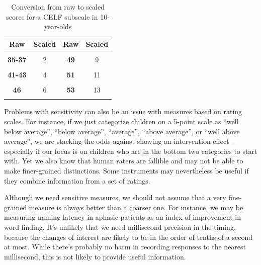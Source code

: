 \documentclass{krantz}
\begin{document}
\begin{table}

\caption{\label{tab:celfexample}Conversion from raw to scaled scores for a CELF subscale in 10-year-olds}
\centering
\begin{tabular}[t]{>{}cc>{}cc}
\toprule
Raw & Scaled & Raw & Scaled\\
\midrule
\textbf{\cellcolor{gray!6}{0-34}} & \cellcolor{gray!6}{1} & \textbf{\cellcolor{gray!6}{48}} & \cellcolor{gray!6}{8}\\
\textbf{35-37} & 2 & \textbf{49} & 9\\
\textbf{\cellcolor{gray!6}{38-40}} & \cellcolor{gray!6}{3} & \textbf{\cellcolor{gray!6}{50}} & \cellcolor{gray!6}{10}\\
\textbf{41-43} & 4 & \textbf{51} & 11\\
\textbf{\cellcolor{gray!6}{44-45}} & \cellcolor{gray!6}{5} & \textbf{\cellcolor{gray!6}{52}} & \cellcolor{gray!6}{12}\\
\addlinespace
\textbf{46} & 6 & \textbf{53} & 13\\
\textbf{\cellcolor{gray!6}{47}} & \cellcolor{gray!6}{7} & \textbf{\cellcolor{gray!6}{54}} & \cellcolor{gray!6}{14}\\
\bottomrule
\end{tabular}
\end{table}

Problems with sensitivity can also be an issue with measures based on rating scales. For instance, if we just categorize children on a 5-point scale as ``well below average'', ``below average'', ``average'', ``above average'', or ``well above average'', we are stacking the odds against showing an intervention effect -- especially if our focus is on children who are in the bottom two categories to start with. Yet we also know that human raters are fallible and may not be able to make finer-grained distinctions. Some instruments may nevertheless be useful if they combine information from a set of ratings.

Although we need sensitive measures, we should not assume that a very fine-grained measure is always better than a coarser one. For instance, we may be measuring naming latency in aphasic patients as an index of improvement in word-finding. It's unlikely that we need millisecond precision in the timing, because the changes of interest are likely to be in the order of tenths of a second at most. While there's probably no harm in recording responses to the nearest millisecond, this is not likely to provide useful information.
\end{document}
